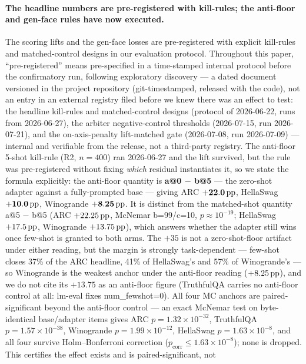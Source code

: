 \paragraph{The headline numbers are pre-registered with kill-rules; the anti-floor
and gen-face rules have now executed.}
The scoring lifts and the gen-face losses are pre-registered with explicit
kill-rules and matched-control designs in our evaluation protocol. Throughout this
paper, ``pre-registered'' means pre-specified in a time-stamped internal protocol
before the confirmatory run, following exploratory discovery --- a dated document
versioned in the project repository (git-timestamped, released with the code), not an
entry in an external registry filed before we knew there was an effect to test: the headline kill-rules and matched-control designs (protocol of 2026-06-22,
runs from 2026-06-27), the arbiter negative-control thresholds (2026-07-15, run
2026-07-21), and the on-axis-penalty lift-matched gate (2026-07-08, run 2026-07-09)
--- internal and verifiable from the release, not a third-party registry. The
anti-floor 5-shot kill-rule (R2, $n{=}400$) ran 2026-06-27 and the lift survived,
but the rule was pre-registered without fixing \emph{which} residual instantiates
it, so we state the formula explicitly: the anti-floor quantity is
\textbf{a@0 $-$ b@5} --- the zero-shot adapter against a fully-prompted base ---
giving ARC $\mathbf{+22.0\,\mathrm{pp}}$, HellaSwag $\mathbf{+10.0\,\mathrm{pp}}$, Winogrande
$\mathbf{+8.25\,\mathrm{pp}}$. It is distinct from the matched-shot quantity a@5 $-$ b@5 (ARC
$+22.25\,\mathrm{pp}$, McNemar b=99/c=10, $p{\approx}10^{-19}$; HellaSwag $+17.5\,\mathrm{pp}$,
Winogrande $+13.75\,\mathrm{pp}$), which answers whether the adapter still wins once few-shot
is granted to both arms. The $+35$ is not a zero-shot-floor artifact under either
reading, but the margin is strongly task-dependent --- few-shot closes 37\% of the
ARC headline, 41\% of HellaSwag's and 57\% of Winogrande's --- so Winogrande is the
weakest anchor under the anti-floor reading ($+8.25\,\mathrm{pp}$), and we do not cite its
$+13.75$ as an anti-floor figure (TruthfulQA carries no anti-floor control at all:
lm-eval fixes num\_fewshot=0). All four MC anchors are paired-significant beyond
the anti-floor control --- an exact McNemar test on byte-identical base/adapter
items gives ARC $p=1.32\times10^{-32}$, TruthfulQA $p=1.57\times10^{-38}$,
Winogrande $p=1.99\times10^{-12}$, HellaSwag $p=1.63\times10^{-8}$, and all four
survive Holm--Bonferroni correction ($p_{\mathrm{corr}} \leq 1.63\times10^{-8}$);
none is dropped. This certifies the effect exists and is paired-significant, not

